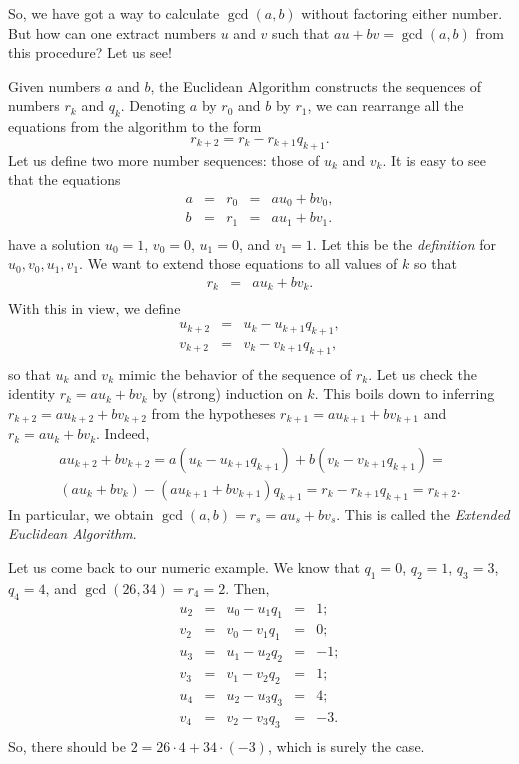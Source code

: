\documentclass[12pt,notitlepage]{article}
\theoremstyle{plain}
\theoremstyle{definition}
\theoremstyle{plain}
\newcommand{\1}{\mathbf{1}}
\newcommand{\0}{\mathbf{0}}
\begin{document}
So, we have got a way to calculate $\gcd(a, b)$ without factoring either number. But how can one extract numbers $u$ and $v$ such that $a u + b v = \gcd(a, b)$ from this procedure? Let us see!

Given numbers $a$ and $b$, the Euclidean Algorithm constructs the sequences of numbers $r_k$ and $q_k$. Denoting $a$ by $r_0$ and $b$ by $r_1$, we can rearrange all the equations from the algorithm to the form
$$r_{k+2} = r_k - r_{k+1}q_{k+1}.$$
Let us define two more number sequences: those of $u_k$ and $v_k$. It is easy to see that the equations
$$
\begin{array}{lcccl}
a &=& r_0 &=& au_0 + bv_0,\\
b &=& r_1 &=& au_1 + bv_1.\\
\end{array}
$$
have a solution $u_0 = 1$, $v_0 = 0$, $u_1 = 0$, and $v_1 = 1$. Let this be the \emph{definition} for $u_0, v_0, u_1, v_1$. We want to extend those equations to all values of $k$ so that
$$
\begin{array}{lcl}
r_k &=& au_k + bv_k.\\
\end{array}
$$
With this in view, we define
$$
\begin{array}{lcl}
u_{k+2} &=& u_k - u_{k+1}q_{k+1},\\
v_{k+2} &=& v_k - v_{k+1}q_{k+1},\\
\end{array}
$$
so that $u_k$ and $v_k$ mimic the behavior of the sequence of $r_k$. Let us check the identity $r_k = au_k + bv_k$ by (strong) induction on $k$. This boils down to inferring $r_{k + 2} = a u_{k+2} + b v_{k+2}$ from the hypotheses $r_{k + 1} = a u_{k+1} + b v_{k+1}$ and $r_{k} = a u_{k} + b v_{k}$. Indeed,
\begin{multline*}
a u_{k+2} + b v_{k+2} = a(u_k - u_{k+1}q_{k+1}) + b(v_k - v_{k+1}q_{k+1}) =\\
 (a u_k + b v_k) - (a u_{k+1} + b v_{k+1})q_{k+1} = r_k - r_{k+1}q_{k+1} = r_{k+2}. 
\end{multline*}
In particular, we obtain $\gcd(a, b) = r_s = a u_s + b v_s$. This is called the \emph{Extended Euclidean Algorithm}.

Let us come back to our numeric example. We know that $q_1 = 0$, $q_2 = 1$, $q_3 = 3$, $q_4 = 4$, and $\gcd(26, 34) = r_4 = 2$. Then,
$$
\begin{array}{lcccl}
u_{2} &=& u_0 - u_{1}q_{1} &=& 1;\\
v_{2} &=& v_0 - v_{1}q_{1} &=& 0;\\
u_{3} &=& u_1 - u_{2}q_{2} &=& -1;\\
v_{3} &=& v_1 - v_{2}q_{2} &=& 1;\\
u_{4} &=& u_2 - u_{3}q_{3} &=& 4;\\
v_{4} &=& v_2 - v_{3}q_{3} &=& -3.\\
\end{array}
$$
So, there should be $2 = 26 \cdot 4 + 34 \cdot (-3)$, which is surely the case. 
\end{document}
